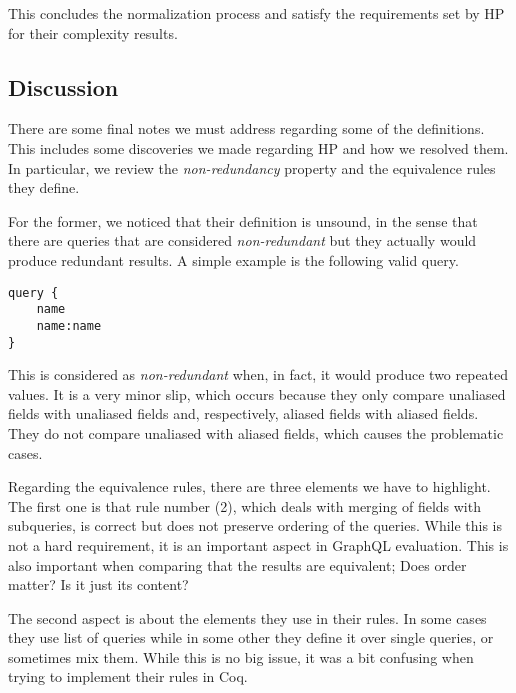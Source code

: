 This concludes the normalization process and satisfy the requirements set by HP for their complexity results.

\iffalse
\begin{verbatim}
query {
    name
    name:name
}
\end{verbatim}
\fi 

\subsection{Discussion}\label{subsec:discussion}

There are some final notes we must address regarding some of the definitions. This includes some discoveries we made regarding HP and how we resolved them. In particular, we review the \textit{non-redundancy} property and the equivalence rules they define.

For the former, we noticed that their definition is unsound, in the sense that there are queries that are considered \textit{non-redundant} but they actually would produce redundant results. A simple example is the following valid query.
\begin{verbatim}
query {
    name
    name:name
}
\end{verbatim}
This is considered as \textit{non-redundant} when, in fact, it would produce two repeated values. It is a very minor slip, which occurs because they only compare unaliased fields with unaliased fields and, respectively, aliased fields with aliased fields. They do not compare unaliased with aliased fields, which causes the problematic cases.

Regarding the equivalence rules, there are three elements we have to highlight. The first one is that rule number (2), which deals with merging of fields with subqueries, is correct but does not preserve ordering of the queries. While this is not a hard requirement, it is an important aspect in GraphQL evaluation. This is also important when comparing that the results are equivalent; Does order matter? Is it just its content? 

The second aspect is about the elements they use  in their rules. In some cases they use list of queries while in some other they define it over single queries, or sometimes mix them. While this is no big issue, it was a bit confusing when trying to implement their rules in Coq.

